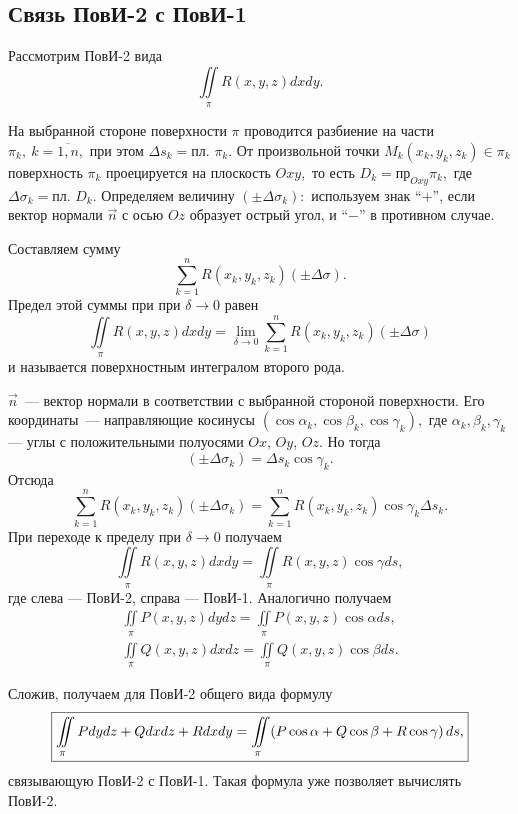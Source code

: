 \documentclass[../../main.tex]{subfiles}
\begin{document}
\subsection{Связь ПовИ-2 с ПовИ-1}

Рассмотрим ПовИ-2 вида \[\iint\limits_\pi R(x, y, z)dxdy.\]

На выбранной стороне поверхности $\pi$ проводится разбиение на части $\pi_k,\
 k=\overline{1,n},$ при этом $\Delta s_k =\text{пл. }\pi_k.$
От произвольной точки $M_k(x_k, y_k, z_k)\in\pi_k$ поверхность $\pi_k$ 
проецируется на плоскость $Oxy,$ то есть $D_k = \text{пр}_{Oxy} \pi_k,$ где
 $\Delta\sigma_k = \text{пл. }D_k.$
Определяем величину $(\pm\Delta\sigma_k):$ 
используем знак ``$+$'', если вектор нормали $\vec{n}$ с осью $Oz$ образует
 острый угол, и ``$-$'' в противном случае.

Составляем сумму \[\sum\limits_{k=1}^n R(x_k, y_k, z_k)(\pm\Delta\sigma).\] 
Предел этой суммы при
 при $\delta\rightarrow 0$ равен
\[\iint\limits_\pi R(x, y, z)dxdy = \lim_{\delta\rightarrow 
0}\sum\limits_{k=1}^n
R(x_k, y_k, z_k)(\pm \Delta\sigma)\] и
называется поверхностным интегралом второго рода.

$\vec n$~--- вектор нормали в соответствии с выбранной стороной поверхности. 
Его координаты~--- направляющие косинусы $(\cos\alpha_k, \cos\beta_k, 
\cos\gamma_k),$ где $\alpha_k, 
\beta_k, \gamma_k$ --- углы с положительными полуосями $Ox$, $Oy$, $Oz$. Но 
тогда
\[(\pm\Delta\sigma_k) = \Delta s_k\cos\gamma_k.\]
Отсюда
\[\sum\limits_{k=1}^n R(x_k, y_k, z_k)(\pm \Delta\sigma_k) = 
\sum\limits_{k=1}^n 
 R(x_k, y_k, z_k) \cos\gamma_k \Delta s_k.\]
При переходе к пределу при $\delta\rightarrow 0$ получаем
\[\iint\limits_\pi R(x, y, z)dxdy = \iint\limits_\pi R(x, y, z) 
\cos\gamma ds,\] где слева --- ПовИ-2, справа --- ПовИ-1.
Аналогично получаем \begin{gather*}\iint\limits_\pi P(x, y, z)dydz = 
\iint\limits_\pi 
P(x, y, z) \cos\alpha ds, \\ \iint\limits_\pi Q(x, y, z)dxdz = \iint\limits_\pi
 Q(x, y, z) \cos\beta ds.\end{gather*}

Сложив, получаем для ПовИ-2 общего вида формулу
\begin{equation}\boxed{\label{lec24, num_1}\iint\limits_\pi Pdydz + Qdxdz + 
Rdxdy = 
\iint\limits_\pi(P\cos\alpha + Q\cos\beta + R\cos\gamma)\,ds,}\end{equation}
связывающую ПовИ-2 с ПовИ-1. Такая формула уже позволяет вычислять ПовИ-2.
\end{document}
